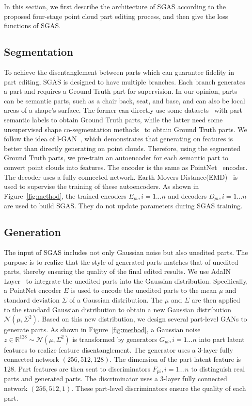 \documentclass[letterpaper]{article} %
\begin{document}
In this section, we first describe the architecture of SGAS according to the proposed four-stage point cloud part editing process, and then give the loss functions of SGAS.

\subsection{Segmentation}

To achieve the disentanglement between parts which can guarantee fidelity in part editing, SGAS is designed to have multiple branches. Each branch generates a part and requires a Ground Truth part for supervision. In our opinion, parts can be semantic parts, such as a chair back, seat, and base, and can also be local areas of a shape's surface. The former can directly use some datasets~\citep{Yi16,Mo_2019_CVPR} with part semantic labels to obtain Ground Truth parts, while the latter need some unsupervised shape co-segmentation methods~\citep{Chen_2019_ICCV,Zhu_2020_CVPR,Zhang_Yang_Wu_Jin_2022} to obtain Ground Truth parts. We follow the idea of l-GAN~\citep{achlioptas2017latent_pc}, which demonstrates that generating on features is better than directly generating on point clouds. Therefore, using the segmented Ground Truth parts, we pre-train an autoencoder for each semantic part to convert point clouds into features. The encoder is the same as PointNet~\citep{Qi_2017_CVPR} encoder. The decoder uses a fully connected network. Earth Movers Distance(EMD)~\citep{Fan_2017_CVPR} is used to supervise the training of these autoencoders. As shown in Figure~\ref{fig:method}, the trained encoders $E_{pi}, i=1...n$ and decoders $D_{pi}, i=1...n$ are used to build SGAS. They do not update parameters during SGAS training.

\subsection{Generation}

The input of SGAS includes not only Gaussian noise but also unedited parts. The purpose is to realize that the style of generated parts matches that of unedited parts, thereby ensuring the quality of the final edited results. We use AdaIN Layer~\citep{Huang_2017_ICCV} to integrate the unedited parts into the Gaussian distribution. Specifically, a PointNet encoder $E$ is used to encode the unedited parts to the mean $\mu$ and standard deviation $\Sigma$ of a Gaussian distribution. The $\mu$ and $\Sigma$ are then applied to the standard Gaussian distribution to obtain a new Gaussian distribution $\mathcal{N}(\mu, \Sigma^2)$. Based on this new distribution, we design several part-level GANs to generate parts. As shown in Figure~\ref{fig:method}, a Gaussian noise $z \in \mathbb{R}^{128} \sim \mathcal{N}(\mu, \Sigma^2)$ is transformed by generators $G_{pi}, i=1...n$ into part latent features to realize feature disentanglement. The generator uses a 3-layer fully connected network $(256, 512, 128)$. The dimension of the part latent feature is 128. Part features are then sent to discriminators $F_{pi}, i=1...n$ to distinguish real parts and generated parts. The discriminator uses a 3-layer fully connected network $(256, 512, 1)$. These part-level discriminators ensure the quality of each part.
\end{document}
